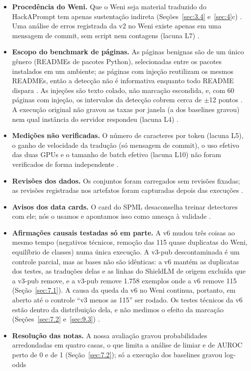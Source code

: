 \documentclass[11pt]{article}
\begin{document}
\begin{itemize}
; as traduções automáticas não foram revisadas por um humano.
\item \textbf{Procedência do Weni.} Que o Weni seja material traduzido do HackAPrompt tem apenas sustentação indireta (Seções~\ref{sec:3.4} e~\ref{sec:4}c)%
. Uma análise de erros registrada da v2 no Weni existe apenas em uma mensagem de commit, sem script nem contagens (lacuna L7)%
.
\item \textbf{Escopo do benchmark de páginas.} As páginas benignas são de um único gênero (READMEs de pacotes Python), selecionadas entre os pacotes instalados em um ambiente; as páginas com injeção reutilizam os mesmos READMEs, então a detecção não é informativa enquanto todo README dispara%
. As injeções são texto colado, não marcação escondida, e, com 60 páginas com injeção, os intervalos da detecção cobrem cerca de \ensuremath{\pm}12 pontos%
. A execução original não gravou as taxas por janela (a dos baselines gravou) nem qual instância do servidor respondeu (lacuna L4)%
.
\item \textbf{Medições não verificadas.} O número de caracteres por token (lacuna L5), o ganho de velocidade da tradução (só mensagem de commit), o uso efetivo das duas GPUs e o tamanho de batch efetivo (lacuna L10) não foram verificados de forma independente%
.
\item \textbf{Revisões dos dados.} Os conjuntos foram carregados sem revisões fixadas; as revisões registradas nos artefatos foram capturadas depois das execuções%
.
\item \textbf{Avisos dos data cards.} O card do SPML desaconselha treinar detectores com ele; nós o usamos e apontamos isso como ameaça à validade%
.
\item \textbf{Afirmações causais testadas só em parte.} A v6 mudou três coisas ao mesmo tempo (negativos técnicos, remoção das 115 quase duplicatas do Weni, equilíbrio de classes) numa única execução. A v3-pub descontaminada é um controle parcial, mas as bases não são idênticas: a v6 mantém as duplicatas dos testes, as traduções delas e as linhas do ShieldLM de origem excluída que a v3-pub remove, e a v3-pub remove 1.758 exemplos onde a v6 remove 115 (Seção~\ref{sec:7.1}). A causa da queda da v6 no Weni continua, portanto, em aberto até o controle ``v3 menos as 115'' ser rodado. Os testes técnicos da v6 estão dentro da distribuição dela, e não medimos o efeito da marcação (Seções~\ref{sec:7.2} e~\ref{sec:9.3})%
.
\item \textbf{Resolução das notas.} A nossa avaliação gravou probabilidades arredondadas em quatro casas, o que limita a análise de limiar e de AUROC perto de 0 e de 1 (Seção~\ref{sec:7.2}); só a execução dos baselines gravou log-odds%

\end{itemize}
\end{document}
